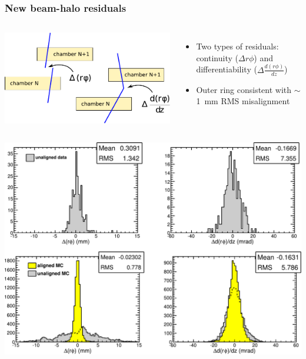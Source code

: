 \documentclass[compress]{beamer}
\begin{document}
\begin{frame}
\frametitle{New beam-halo residuals}
\begin{columns}
\includegraphics[width=\linewidth]{residuals_diagrams.pdf}

\begin{itemize}
\item Two types of residuals: continuity ($\Delta r\phi$) and differentiability ($\Delta \frac{d(r\phi)}{dz}$)
\item Outer ring consistent with $\sim$1~mm RMS misalignment
\end{itemize}
\end{columns}

\begin{center}
\includegraphics[width=0.8\linewidth]{outer_residuals.pdf}
\end{center}
\end{frame}
\end{document}
